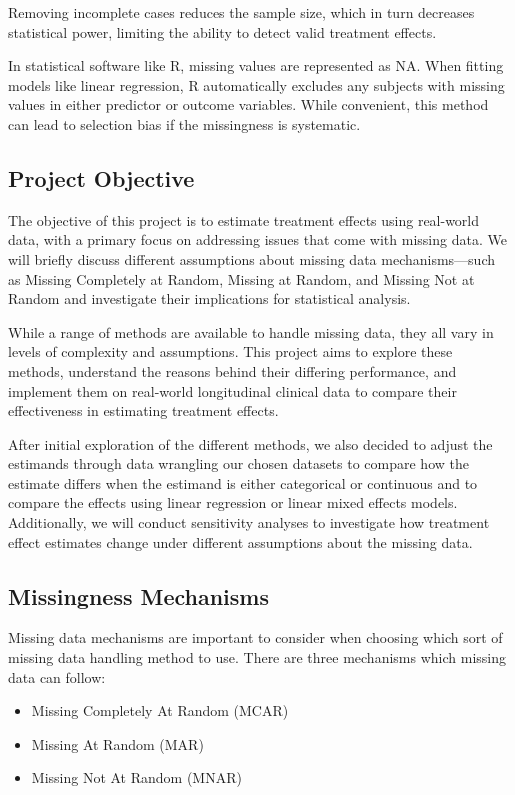 \documentclass{article}
\providecommand{\tightlist}{%
  \setlength{\itemsep}{0pt}\setlength{\parskip}{0pt}}
\begin{document}
Removing incomplete cases reduces the sample size, which in turn
decreases statistical power, limiting the ability to detect valid
treatment effects.

In statistical software like R, missing values are represented as NA.
When fitting models like linear regression, R automatically excludes any
subjects with missing values in either predictor or outcome variables.
While convenient, this method can lead to selection bias if the
missingness is systematic.

\subsection{Project Objective}\label{project-objective}

The objective of this project is to estimate treatment effects using
real-world data, with a primary focus on addressing issues that come
with missing data. We will briefly discuss different assumptions about
missing data mechanisms---such as Missing Completely at Random, Missing
at Random, and Missing Not at Random and investigate their implications
for statistical analysis.

While a range of methods are available to handle missing data, they all
vary in levels of complexity and assumptions. This project aims to
explore these methods, understand the reasons behind their differing
performance, and implement them on real-world longitudinal clinical data
to compare their effectiveness in estimating treatment effects.

After initial exploration of the different methods, we also decided to
adjust the estimands through data wrangling our chosen datasets to
compare how the estimate differs when the estimand is either categorical
or continuous and to compare the effects using linear regression or
linear mixed effects models. Additionally, we will conduct sensitivity
analyses to investigate how treatment effect estimates change under
different assumptions about the missing data.

\subsection{Missingness Mechanisms}\label{missingness-mechanisms}

Missing data mechanisms are important to consider when choosing which
sort of missing data handling method to use. There are three mechanisms
which missing data can follow:

\begin{itemize}
\tightlist
\item
  Missing Completely At Random (MCAR)
\item
  Missing At Random (MAR)
\item
  Missing Not At Random (MNAR)
\end{itemize}
\end{document}
